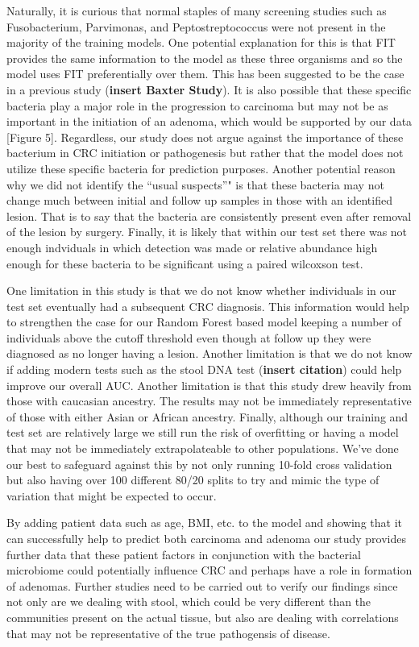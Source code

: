 \documentclass[12pt,]{article}
\begin{document}
Naturally, it is curious that normal staples of many screening studies
such as Fusobacterium, Parvimonas, and Peptostreptococcus were not
present in the majority of the training models. One potential
explanation for this is that FIT provides the same information to the
model as these three organisms and so the model uses FIT preferentially
over them. This has been suggested to be the case in a previous study
(\textbf{insert Baxter Study}). It is also possible that these specific
bacteria play a major role in the progression to carcinoma but may not
be as important in the initiation of an adenoma, which would be
supported by our data {[}Figure 5{]}. Regardless, our study does not
argue against the importance of these bacterium in CRC initiation or
pathogenesis but rather that the model does not utilize these specific
bacteria for prediction purposes. Another potential reason why we did
not identify the ``usual suspects''" is that these bacteria may not
change much between initial and follow up samples in those with an
identified lesion. That is to say that the bacteria are consistently
present even after removal of the lesion by surgery. Finally, it is
likely that within our test set there was not enough indviduals in which
detection was made or relative abundance high enough for these bacteria
to be significant using a paired wilcoxson test.

One limitation in this study is that we do not know whether individuals
in our test set eventually had a subsequent CRC diagnosis. This
information would help to strengthen the case for our Random Forest
based model keeping a number of individuals above the cutoff threshold
even though at follow up they were diagnosed as no longer having a
lesion. Another limitation is that we do not know if adding modern tests
such as the stool DNA test (\textbf{insert citation}) could help improve
our overall AUC. Another limitation is that this study drew heavily from
those with caucasian ancestry. The results may not be immediately
representative of those with either Asian or African ancestry. Finally,
although our training and test set are relatively large we still run the
risk of overfitting or having a model that may not be immediately
extrapolateable to other populations. We've done our best to safeguard
against this by not only running 10-fold cross validation but also
having over 100 different 80/20 splits to try and mimic the type of
variation that might be expected to occur.

By adding patient data such as age, BMI, etc. to the model and showing
that it can successfully help to predict both carcinoma and adenoma our
study provides further data that these patient factors in conjunction
with the bacterial microbiome could potentially influence CRC and
perhaps have a role in formation of adenomas. Further studies need to be
carried out to verify our findings since not only are we dealing with
stool, which could be very different than the communities present on the
actual tissue, but also are dealing with correlations that may not be
representative of the true pathogensis of disease.
\end{document}
